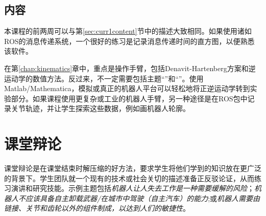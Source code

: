 \subsection{内容}
本课程的前两周可以与第\ref{sec:curr1content}节中的描述大致相同。如果使用诸如ROS的消息传递系统，一个很好的练习是记录消息传递时间的直方图，以便熟悉该软件。


在第\ref{chap:kinematics}章中，重点是操作手臂，包括Denavit-Hartenberg方案和逆运动学的数值方法。反过来，不一定需要包括主题“”和“”。使用Matlab/Mathematica，模拟或真正的机器人平台可以轻松地将正逆运动学转到实验部分。如果课程使用更复杂或工业的机器人手臂，另一种途径是在ROS包中记录关节轨迹，并让学生探索这些数据，例如画机器人轮廓。


\section{课堂辩论} 
\label{sec:debates}
课堂辩论是在课堂结束时解压缩的好方法，要求学生将他们学到的知识放在更广泛的背景下。学生团队就一个现有的技术或社会关切的描述准备正反驳论证，从而练习演讲和研究技能。示例主题包括\emph{机器人让人失去工作是一种需要缓解的风险}；\emph{机器人不应该具备自主卸载武器/在城市中驾驶（自主汽车）的能力};或\emph{机器人需要由链接、关节和齿轮以外的组件制成，以达到人们的敏捷性}。

